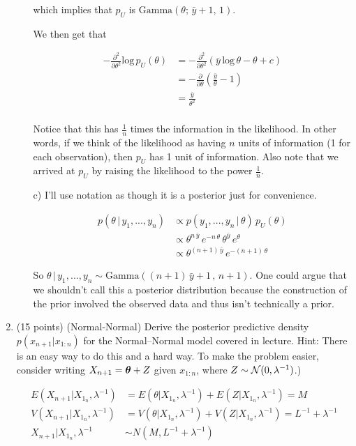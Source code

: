 \documentclass{article}
\begin{document}
\begin{enumerate}
\begin{itemize}
     which implies that $p_U$ is $\text{Gamma}(\theta;\,\bar{y}+1,\,1).$
     
     We then get that 
     
     \begin{align*}
         - \frac{\partial^2}{\partial\theta^2} \text{log}\,p_U(\theta) &= - \frac{\partial^2}{\partial\theta^2} \left(\bar{y}\,\text{log}\,\theta - \theta + c\right) \\ 
         &= - \frac{\partial}{\partial\theta} \left(\frac{\bar{y}}{\theta} -1\right) \\
         &= \frac{\bar{y}}{\theta^2} \\
     \end{align*}
     
     Notice that this has $\frac1n$ times the information in the likelihood. In other words, if we think of the likelihood as having $n$ units of information (1 for each observation), then $p_U$ has 1 unit of information. Also note that we arrived at $p_U$ by raising the likelihood to the power $\frac1n.$
     \item[c)] I'll use notation as though it is a posterior just for convenience. 
     
     \begin{align*}
         p(\theta \,|\, y_1, ..., y_n) &\propto p(y_1, ..., y_n\,|\,\theta) \, p_U(\theta) \\
         &\propto \theta^{n\,\bar{y}}\,e^{-n\,\theta}\,\theta^{\bar{y}}\,e^{\theta} \\ 
         &\propto \theta^{(n+1)\,\bar{y}}\,e^{-(n+1)\,\theta}
     \end{align*}
     
     So $\theta \,|\, y_1, ..., y_n \sim \text{Gamma}((n+1)\,\bar{y}+1\,,\,n+1 ).$ One could argue that we shouldn't call this a posterior distribution because the construction of the prior involved the observed data and thus isn't technically a prior. 
\end{itemize}



\item (15 points) (Normal-Normal)  Derive the posterior predictive density $p(x_{n +1}|x_{1:n})$ for the Normal--Normal model covered in lecture. Hint: There is an easy way to do this and a hard way. To make the problem easier, consider writing $X_{n+1} = {\bm\theta} + Z$ given $x_{1:n}$, where $Z\sim\mathcal{N}(0,\lambda^{-1})$.)


\begin{align*}
E(X_{n+1}|X_{1_n}, \lambda^{-1}) &= E(\theta|X_{1_n}, \lambda^{-1}) + E(Z|X_{1_n}, \lambda^{-1}) = M \\
V(X_{n+1}|X_{1_n}, \lambda^{-1}) &=  V(\theta|X_{1_n}, \lambda^{-1}) + V(Z|X_{1_n}, \lambda^{-1}) = L^{-1} + \lambda^{-1} \\
X_{n+1}|X_{1_n}, \lambda^{-1} &\sim N(M, L^{-1} + \lambda^{-1})
\end{align*}


\end{enumerate}
\end{document}
